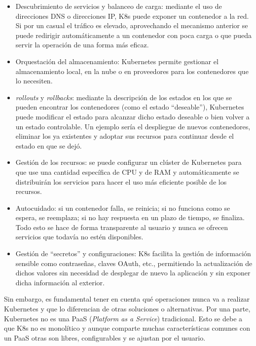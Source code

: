 \begin{itemize}
    \item Descubrimiento de servicios y balanceo de carga: mediante el uso de
          direcciones DNS o direcciones IP, K8s puede exponer un contenedor
          a la red. Si por un casual el tráfico es elevado, aprovechando el
          mecanismo anterior se puede redirigir automáticamente a un contenedor
          con poca carga o que pueda servir la operación de una forma más
          eficaz.
    \item Orquestación del almacenamiento: Kubernetes permite gestionar el
          almacenamiento local, en la nube o en proveedores para los contenedores
          que lo necesiten.
    \item \textit{rollouts} y \textit{rollbacks}: mediante la descripción de
          los estados en los que se pueden encontrar los contenedores (como el
          estado ``deseable''), Kubernetes puede modificar el estado para
          alcanzar dicho estado deseable o bien volver a un estado controlable.
          Un ejemplo sería el despliegue de nuevos contenedores, eliminar los
          ya existentes y adoptar sus recursos para continuar desde el
          estado en que se dejó.
    \item Gestión de los recursos: se puede configurar un clúster de Kubernetes
          para que use una cantidad específica de CPU y de RAM y automáticamente
          se distribuirán los servicios para hacer el uso más eficiente posible
          de los recursos.
    \item Autocuidado: si un contenedor falla, se reinicia; si no funciona como
          se espera, se reemplaza; si no hay respuesta en un plazo de tiempo, se
          finaliza. Todo esto se hace de forma transparente al usuario y nunca se
          ofrecen servicios que todavía no estén disponibles.
    \item Gestión de ``secretos'' y configuraciones: K8s facilita la gestión
          de información sensible como contraseñas, claves OAuth, etc., permitiendo
          la actualización de dichos valores sin necesidad de desplegar de nuevo
          la aplicación y sin exponer dicha información al exterior.
\end{itemize}

Sin embargo, es fundamental tener en cuenta qué operaciones nunca va a realizar
Kubernetes y que lo diferencian de otras soluciones o alternativas. Por una parte,
Kubernetes no es una PaaS (\textit{Platform as a Service}) tradicional. Esto se
debe a que K8s no es monolítico y aunque comparte muchas características comunes
con un PaaS otras son libres, configurables y se ajustan por el usuario.

